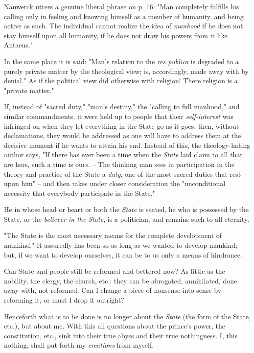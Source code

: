 \documentclass[a4paper]{book}
\begin{document}
Nauwerck utters a genuine liberal phrase on p. 16: "{}Man completely fulfills 
his calling only in feeling and knowing himself as a member of humanity, and 
being active as such. The individual cannot realize the idea of 
\textit{manhood} if he does not stay himself upon all humanity, if he does not 
draw his powers from it like Antaeus."{}

In the same place it is said: "{}Man's relation to the \textit{res publica} is 
degraded to a purely private matter by the theological view; is, accordingly, 
made away with by denial."{} As if the political view did otherwise with 
religion! There religion is a "{}private matter."{}

If, instead of "{}sacred duty,"{} "{}man's destiny,"{} the "{}calling to full 
manhood,"{} and similar commandments, it were held up to people that their 
\textit{self-interest} was infringed on when they let everything in the State 
go as it goes, then, without declamations, they would be addressed as one will 
have to address them at the decisive moment if he wants to attain his end. 
Instead of this, the theology-hating author says, "{}If there has ever been a 
time when the \textit{State} laid claim to all that are hers, such a time is 
ours. -- The thinking man sees in participation in the theory and practice of 
the State a \textit{duty}, one of the most sacred duties that rest upon him"{} 
-- and then takes under closer consideration the "{}unconditional necessity 
that everybody participate in the State."{}

He in whose head or heart or both the \textit{State} is seated, he who is 
possessed by the State, or the \textit{believer in the State}, is a 
politician, and remains such to all eternity.

"{}The State is the most necessary means for the complete development of 
mankind."{} It assuredly has been so as long as we wanted to develop mankind; 
but, if we want to develop ourselves, it can be to us only a means of 
hindrance.

Can State and people still be reformed and bettered now? As little as the 
nobility, the clergy, the church, etc.: they can be abrogated, annihilated, 
done away with, not reformed. Can I change a piece of nonsense into sense by 
reforming it, or must I drop it outright?

Henceforth what is to be done is no longer about the \textit{State} (the form 
of the State, etc.), but about me. With this all questions about the prince's 
power, the constitution, etc., sink into their true abyss and their true 
nothingness. I, this nothing, shall put forth my \textit{creations} from 
myself.
\end{document}
